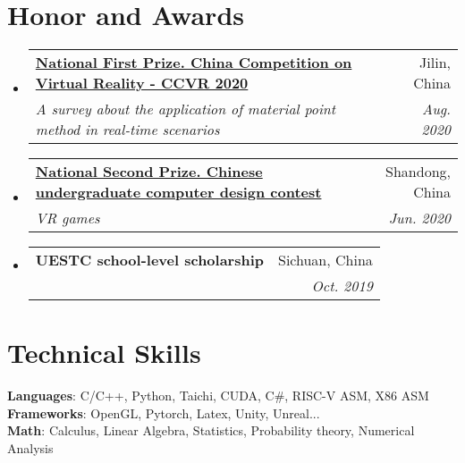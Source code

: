 \documentclass[letterpaper,11pt]{article}
\makeatletter
\newcommand{\resumeSubheading}[4]{
  \vspace{-2pt}\item
    \begin{tabular*}{0.97\textwidth}[t]{l@{\extracolsep{\fill}}r}
      \textbf{#1} & #2 \\
      \textit{\small#3} & \textit{\small #4} \\
    \end{tabular*}\vspace{-7pt}
}
\newcommand{\resumeSubHeadingListStart}{\begin{itemize}[leftmargin=0.15in, label={}]}
\newcommand{\resumeSubHeadingListEnd}{\end{itemize}}
\makeatother
\begin{document}
\section{Honor and Awards}
  \resumeSubHeadingListStart
    \resumeSubheading
      {\href{https://www.chinavr.info/news/show/id/3659.html}{National First Prize. China Competition on Virtual Reality -  CCVR 2020}}{Jilin, China }
      {A survey about the application of material point method in real-time scenarios }{Aug. 2020}
    \resumeSubheading
      {\href{http://jsjds.ruc.edu.cn/UploadFiles/202082817196435.pdf}{National Second Prize. Chinese undergraduate computer design contest}}{Shandong, China }
      {VR games}{Jun. 2020}
     \resumeSubheading
      {UESTC school-level scholarship}{Sichuan, China }
      {}{Oct. 2019}
 \resumeSubHeadingListEnd

%
\section{Technical Skills}
 \begin{itemize}[leftmargin=0.15in, label={}]
    \small{\item{
     \textbf{Languages}{: C/C++, Python, Taichi, CUDA, C\#, RISC-V ASM, X86 ASM} \\
     \textbf{Frameworks}{: OpenGL, Pytorch, Latex, Unity, Unreal... } \\
     \textbf{Math}{: Calculus, Linear Algebra, Statistics, Probability theory, Numerical Analysis}
    }}
 \end{itemize}


\end{document}

